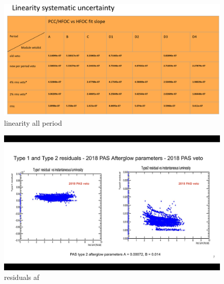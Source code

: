 \begin{figure}[!htp]
\centering
\includegraphics[width=1\textwidth]{ashish_thesis/lineairty_diff_veto_period_variation_slope.png}
\caption{%
linearity all period
}
\label{fig:linearityperperiod}
\end{figure}


\begin{figure}[!htp]
\centering
\includegraphics[width=1\textwidth]{ashish_thesis/type1_type2_af_residuals_oldveto_oldp.png}
\caption{%
residuals af
}
\label{fig:afres}
\end{figure}


